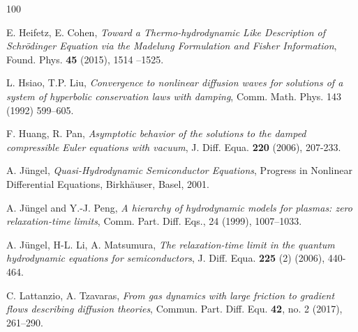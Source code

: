 \documentclass[english]{amsart}
\theoremstyle{plain}
\theoremstyle{definition}
\theoremstyle{remark}
\theoremstyle{plain}
\theoremstyle{plain}
\theoremstyle{plain}
\numberwithin{equation}{section}
\begin{document}
\begin{thebibliography}{100}

 E. Heifetz, E. Cohen, \emph{Toward a Thermo-hydrodynamic Like Description of Schr\"odinger Equation via the Madelung Formulation and Fisher Information}, Found. Phys. {\bf 45} (2015), 1514 --1525.

 L. Hsiao, T.P. Liu, \emph{Convergence to nonlinear diffusion waves for solutions of a system of hyperbolic
conservation laws with damping}, Comm. Math. Phys. 143 (1992) 599–605.

 F. Huang, R. Pan, \emph{Asymptotic behavior of the solutions to the damped compressible Euler equations with vacuum}, J. Diff. Equa. {\bf 220} (2006), 207-233.

 A. J\"ungel, \emph{Quasi-Hydrodynamic Semiconductor Equations}, Progress in Nonlinear Differential Equations, Birkh\"auser, Basel, 2001.

 A. J\"ungel and Y.-J. Peng, \emph{A hierarchy of hydrodynamic models for plasmas: zero relaxation-time limits}, Comm. Part. Diff. Eqs., 24 (1999), 1007–1033.

 A. J\"{u}ngel, H-L. Li, A. Matsumura, \emph{The relaxation-time limit in the quantum hydrodynamic equations for semiconductors}, J. Diff. Equa. {\bf 225} (2) (2006), 440-464.









 C. Lattanzio, A. Tzavaras, \emph{From gas dynamics with large friction to gradient flows describing diffusion theories}, Commun. Part. Diff. Equ. {\bf 42}, no. 2 (2017), 261--290.


\end{thebibliography}
\end{document}
